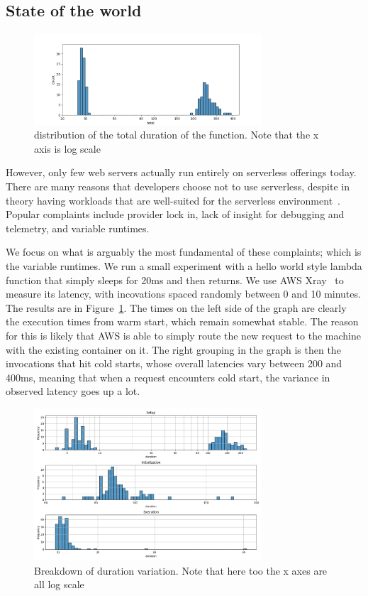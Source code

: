\subsection{State of the world}


\begin{figure}[t!]
    \centering
      \includegraphics[width=8.5cm]{img/lambda_total_durations.png}
      \caption{ distribution of the total duration of the function. Note that the x axis is log scale }
    \label{fig:lambda-total-durations}
\end{figure}

However, only few web servers actually run entirely on serverless offerings
today. There are many reasons that developers choose not to use serverless,
despite in theory having workloads that are well-suited for the serverless
environment~\cite{not-lambda-blog,reddit-serverless2}. Popular complaints
include provider lock in, lack of insight for debugging and telemetry, and
variable runtimes.


We focus on what is arguably the most fundamental of these complaints; which is
the variable runtimes. We run a small experiment with a hello world style lambda
function that simply sleeps for 20ms and then returns. We use AWS
Xray~\cite{aws-xray} to measure its latency, with incovations spaced randomly
between 0 and 10 minutes. The results are in
Figure~\ref{fig:lambda-total-durations}. The times on the left side of the graph
are clearly the execution times from warm start, which remain somewhat stable.
The reason for this is likely that AWS is able to simply route the new request
to the machine with the existing container on it. The right grouping in the
graph is then the invocations that hit cold starts, whose overall latencies vary
between 200 and 400ms, meaning that when a request encounters cold start, the
variance in observed latency goes up a lot. 

\begin{figure}[t!]
  \centering
    \includegraphics[width=8.5cm]{img/lambda_duration_breakdown.png}
    \caption{ Breakdown of duration variation. Note that here too the x axes are all log scale }
  \label{fig:lambda-durations-breakdown}
\end{figure}


